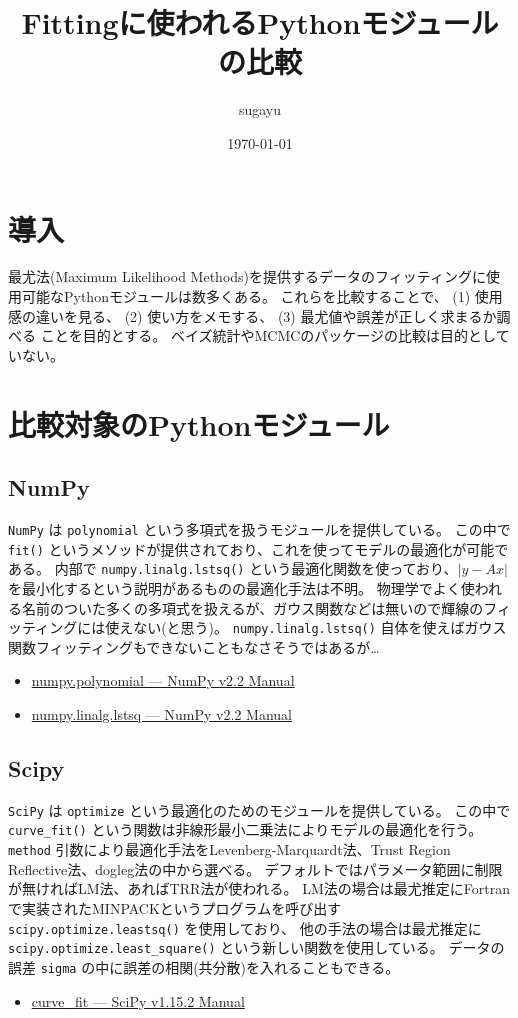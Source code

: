 \documentclass[a4paper, 9pt, notitlepage, uplatex, dvipdfmx]{jsarticle}
\author{sugayu}
\date{\today}
\title{\textbf{Fittingに使われるPythonモジュールの比較}}
\begin{document}
\maketitle
\section{導入}
\label{sec:org8cc2c74}
最尤法(Maximum Likelihood Methods)を提供するデータのフィッティングに使用可能なPythonモジュールは数多くある。
これらを比較することで、
(1) 使用感の違いを見る、
(2) 使い方をメモする、
(3) 最尤値や誤差が正しく求まるか調べる
ことを目的とする。
ベイズ統計やMCMCのパッケージの比較は目的としていない。
\section{比較対象のPythonモジュール}
\label{sec:orgdf3c0f7}
\subsection{NumPy}
\label{sec:orgfc1de6d}
\texttt{NumPy} は \texttt{polynomial} という多項式を扱うモジュールを提供している。
この中で \texttt{fit()} というメソッドが提供されており、これを使ってモデルの最適化が可能である。
内部で \texttt{numpy.linalg.lstsq()} という最適化関数を使っており、\(|y - Ax |\) を最小化するという説明があるものの最適化手法は不明。
物理学でよく使われる名前のついた多くの多項式を扱えるが、ガウス関数などは無いので輝線のフィッティングには使えない(と思う)。
\texttt{numpy.linalg.lstsq()} 自体を使えばガウス関数フィッティングもできないこともなさそうではあるが\ldots{}
\begin{itemize}
\item \href{https://numpy.org/doc/stable/reference/routines.polynomials-package.html\#module-numpy.polynomial}{numpy.polynomial — NumPy v2.2 Manual}
\item \href{https://numpy.org/doc/stable/reference/generated/numpy.linalg.lstsq.html\#numpy.linalg.lstsq}{numpy.linalg.lstsq — NumPy v2.2 Manual}
\end{itemize}
\subsection{Scipy}
\label{sec:orgf79f88d}
\texttt{SciPy} は \texttt{optimize} という最適化のためのモジュールを提供している。
この中で \texttt{curve\_fit()} という関数は非線形最小二乗法によりモデルの最適化を行う。
\texttt{method} 引数により最適化手法をLevenberg-Marquardt法、Trust Region Reflective法、dogleg法の中から選べる。
デフォルトではパラメータ範囲に制限が無ければLM法、あればTRR法が使われる。
LM法の場合は最尤推定にFortranで実装されたMINPACKというプログラムを呼び出す \texttt{scipy.optimize.leastsq()} を使用しており、
他の手法の場合は最尤推定に \texttt{scipy.optimize.least\_square()} という新しい関数を使用している。
データの誤差 \texttt{sigma} の中に誤差の相関(共分散)を入れることもできる。
\begin{itemize}
\item \href{https://docs.scipy.org/doc/scipy/reference/generated/scipy.optimize.curve\_fit.html}{curve\_fit — SciPy v1.15.2 Manual}
\end{itemize}
\end{document}
